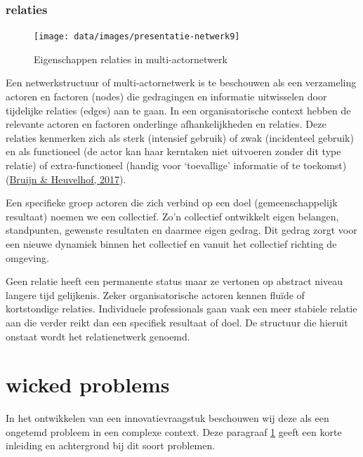 \documentclass[
]{book}
\begin{document}
\hypertarget{relaties}{%
\subsubsection{relaties}\label{relaties}}

\begin{figure}

{\centering \texttt{[image: data/images/presentatie-netwerk9]} 

}

\caption{Eigenschappen relaties in multi-actornetwerk}\label{fig:relaties}
\end{figure}

Een netwerkstructuur of multi-actornetwerk is te beschouwen als een verzameling actoren en factoren (nodes) die gedragingen en informatie uitwisselen door tijdelijke relaties (edges) aan te gaan. In een organisatorische context hebben de relevante actoren en factoren onderlinge afhankelijkheden en relaties. Deze relaties kenmerken zich als sterk (intensief gebruik) of zwak (incidenteel gebruik) en als functioneel (de actor kan haar kerntaken niet uitvoeren zonder dit type relatie) of extra-functioneel (handig voor `toevallige' informatie of te toekomst) (\protect\hyperlink{ref-bruijn2017management}{Bruijn \& Heuvelhof, 2017}).

Een specifieke groep actoren die zich verbind op een doel (gemeenschappelijk resultaat) noemen we een collectief. Zo'n collectief ontwikkelt eigen belangen, standpunten, gewenste resultaten en daarmee eigen gedrag. Dit gedrag zorgt voor een nieuwe dynamiek binnen het collectief en vanuit het collectief richting de omgeving.

Geen relatie heeft een permanente status maar ze vertonen op abstract niveau langere tijd gelijkenis. Zeker organisatorische actoren kennen fluïde of kortstondige relaties. Individuele professionals gaan vaak een meer stabiele relatie aan die verder reikt dan een specifiek resultaat of doel. De structuur die hieruit onstaat wordt het relatienetwerk genoemd.

\hypertarget{wicked-problems}{%
\section{wicked problems}\label{wicked-problems}}

In het ontwikkelen van een innovatievraagstuk beschouwen wij deze als een ongetemd probleem in een complexe context. Deze paragraaf \ref{wicked-problems} geeft een korte inleiding en achtergrond bij dit soort problemen.
\end{document}
